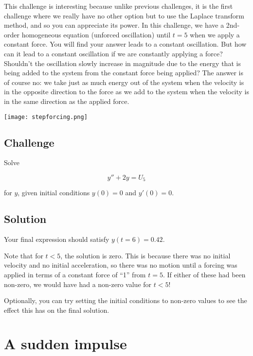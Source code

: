 This challenge is interesting because unlike previous challenges, it is the first challenge where we really have no other option but to use the Laplace transform method, and so you can appreciate its power. In this challenge, we have a 2nd-order homogeneous equation (unforced oscillation) until $t=5$ when we apply a constant force. You will find your answer leads to a constant oscillation. But how can it lead to a constant oscillation if we are constantly applying a force? Shouldn't the oscillation slowly increase in magnitude due to the energy that is being added to the system from the constant force being applied? The answer is of course no: we take just as much energy out of the system when the velocity is in the opposite direction to the force as we add to the system when the velocity is in the same direction as the applied force.

\texttt{[image: stepforcing.png]}

\subsection*{Challenge}
Solve

\begin{equation}
    y''+2y=U_5
\end{equation}

for $y$, given initial conditions $y(0)=0$ and $y'(0)=0$. 

\subsection*{Solution}
Your final expression should satisfy $y(t=6)=0.42$.

Note that for $t<5$, the solution is zero. This is because there was no initial velocity and no initial acceleration, so there was no motion until a forcing was applied in terms of a constant force of ``1'' from $t=5$. If either of these had been non-zero, we would have had a non-zero value for $t<5$!

Optionally, you can try setting the initial conditions to non-zero values to see the effect this has on the final solution.



\iffalse
\newpage
\section{A sudden impulse}

